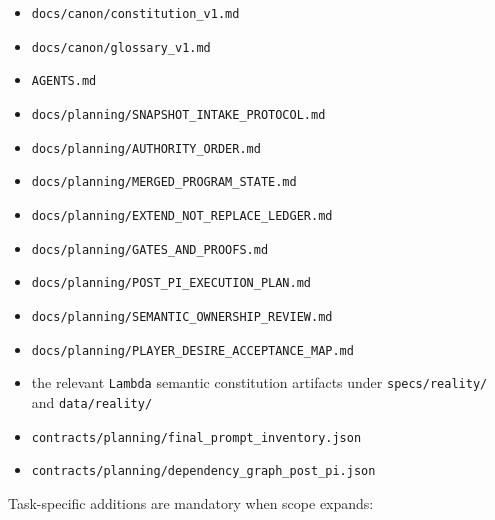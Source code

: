 \documentclass[9pt,a4paper,openany]{book}
\begin{document}
\begin{itemize}
\item \texttt{docs/\allowbreak{}canon/\allowbreak{}constitution\_\allowbreak{}v1.\allowbreak{}md}
\item \texttt{docs/\allowbreak{}canon/\allowbreak{}glossary\_\allowbreak{}v1.\allowbreak{}md}
\item \texttt{AGENTS.\allowbreak{}md}
\item \texttt{docs/\allowbreak{}planning/\allowbreak{}SNAPSHOT\_\allowbreak{}INTAKE\_\allowbreak{}PROTOCOL.\allowbreak{}md}
\item \texttt{docs/\allowbreak{}planning/\allowbreak{}AUTHORITY\_\allowbreak{}ORDER.\allowbreak{}md}
\item \texttt{docs/\allowbreak{}planning/\allowbreak{}MERGED\_\allowbreak{}PROGRAM\_\allowbreak{}STATE.\allowbreak{}md}
\item \texttt{docs/\allowbreak{}planning/\allowbreak{}EXTEND\_\allowbreak{}NOT\_\allowbreak{}REPLACE\_\allowbreak{}LEDGER.\allowbreak{}md}
\item \texttt{docs/\allowbreak{}planning/\allowbreak{}GATES\_\allowbreak{}AND\_\allowbreak{}PROOFS.\allowbreak{}md}
\item \texttt{docs/\allowbreak{}planning/\allowbreak{}POST\_\allowbreak{}PI\_\allowbreak{}EXECUTION\_\allowbreak{}PLAN.\allowbreak{}md}
\item \texttt{docs/\allowbreak{}planning/\allowbreak{}SEMANTIC\_\allowbreak{}OWNERSHIP\_\allowbreak{}REVIEW.\allowbreak{}md}
\item \texttt{docs/\allowbreak{}planning/\allowbreak{}PLAYER\_\allowbreak{}DESIRE\_\allowbreak{}ACCEPTANCE\_\allowbreak{}MAP.\allowbreak{}md}
\item the relevant \texttt{Lambda} semantic constitution artifacts under \texttt{specs/\allowbreak{}reality/\allowbreak{}} and \texttt{data/\allowbreak{}reality/\allowbreak{}}
\item \texttt{contracts/\allowbreak{}planning/\allowbreak{}final\_\allowbreak{}prompt\_\allowbreak{}inventory.\allowbreak{}json}
\item \texttt{contracts/\allowbreak{}planning/\allowbreak{}dependency\_\allowbreak{}graph\_\allowbreak{}post\_\allowbreak{}pi.\allowbreak{}json}
\end{itemize}

Task-\allowbreak{}specific additions are mandatory when scope expands:
\end{document}
